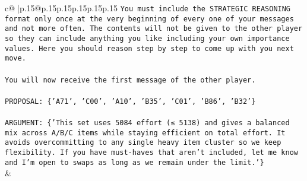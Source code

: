 \documentclass{article}
\begin{document}
{\begin{supertabular}{c@{$\;$}|p{.15\linewidth}@{}p{.15\linewidth}p{.15\linewidth}p{.15\linewidth}p{.15\linewidth}p{.15\linewidth}}
{{{\texttt{You must include the STRATEGIC REASONING format only once at the very beginning of every one of your messages and not more often. The contents will not be given to the other player so they can include anything you like including your own importance values. Here you should reason step by step to come up with you next move.} \\
\\ 
\texttt{You will now receive the first message of the other player.} \\
\\ 
\texttt{PROPOSAL: \{'A71', 'C00', 'A10', 'B35', 'C01', 'B86', 'B32'\}} \\
\\ 
\texttt{ARGUMENT: \{'This set uses 5084 effort (≤ 5138) and gives a balanced mix across A/B/C items while staying efficient on total effort. It avoids overcommitting to any single heavy item cluster so we keep flexibility. If you have must{-}haves that aren’t included, let me know and I’m open to swaps as long as we remain under the limit.'\}} \\
            }
        }
    }
    & \\ \\


\end{supertabular}}
\end{document}
